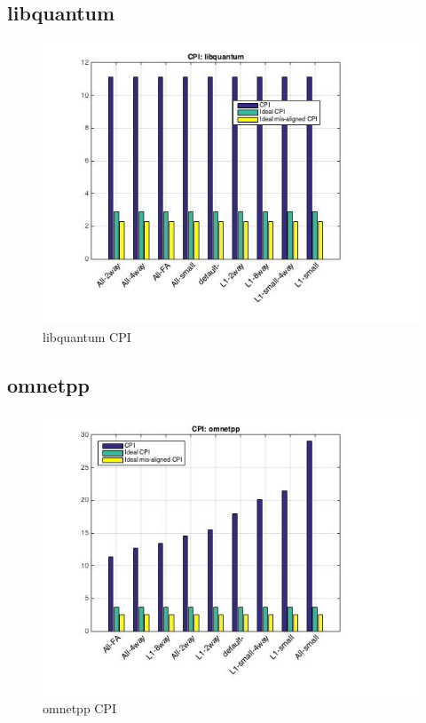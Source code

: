 \documentclass[11pt,titlepage]{article}
\begin{document}
    \subsection{libquantum}
        \begin{figure}[H]
            \centering
            \includegraphics[scale=0.75]{CPIlibquantum}
            \caption{libquantum CPI}
            \label{fig:CPIlibquantum}
        \end{figure}

    \subsection{omnetpp}
        \begin{figure}[H]
            \centering
            \includegraphics[scale=0.75]{CPIomnetpp}
            \caption{omnetpp CPI}
            \label{fig:CPIomnetpp}
        \end{figure}
\end{document}
